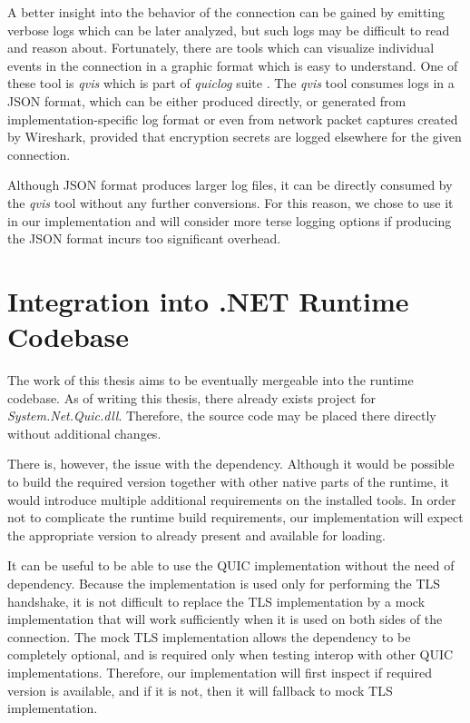 A better insight into the behavior of the connection can be gained by emitting verbose logs which
can be later analyzed, but such logs may be difficult to read and reason about. Fortunately, there
are tools which can visualize individual events in the connection in a graphic format which is easy
to understand. One of these tool is \textit{qvis} \cite{web:qvis} which is part of \textit{quiclog}
suite \cite{githubquiclog}. The \textit{qvis} tool consumes logs in a JSON format, which can be
either produced directly, or generated from implementation-specific log format or even from network
packet captures created by Wireshark, provided that encryption secrets are logged elsewhere for the
given connection.

Although JSON format produces larger log files, it can be directly consumed by the \textit{qvis}
tool without any further conversions. For this reason, we chose to use it in our implementation and
will consider more  terse logging options if producing the JSON format incurs too significant
overhead.

\section{Integration into .NET Runtime Codebase}

The work of this thesis aims to be eventually mergeable into the \dotnet{} runtime codebase. As of
writing this thesis, there already exists project for \textit{System.Net.Quic.dll}. Therefore, the
source code may be placed there directly without additional changes.

There is, however, the issue with the \libopenssl{} dependency. Although it would be possible to
build the required \libopenssl{} version together with other native parts of the \dotnet{} runtime,
it would introduce multiple additional requirements on the installed tools. In order not to
complicate the runtime build requirements, our implementation will expect the appropriate
\libopenssl{} version to already present and available for loading.

It can be useful to be able to use the QUIC implementation without the need of \libopenssl{}
dependency. Because the \libopenssl{} implementation is used only for performing the TLS handshake,
it is not difficult to replace the TLS implementation by a mock implementation that will work
sufficiently when it is used on both sides of the connection. The mock TLS implementation allows the
\libopenssl{} dependency to be completely optional, and is required only when testing interop with
other QUIC implementations. Therefore, our implementation will first inspect if required
\libopenssl{} version is available, and if it is not, then it will fallback to mock TLS
implementation.
